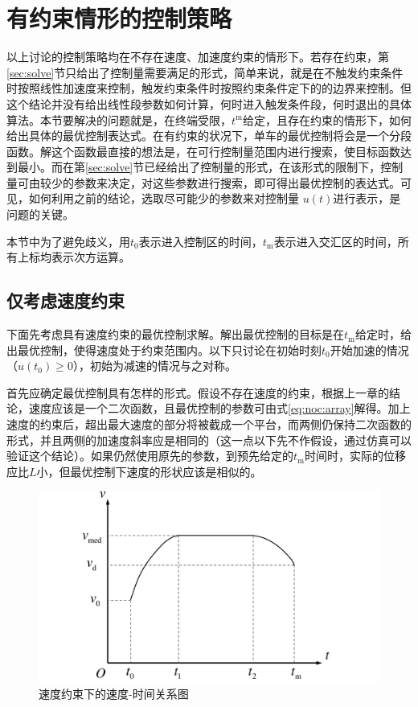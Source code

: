 \section{有约束情形的控制策略}
以上讨论的控制策略均在不存在速度、加速度约束的情形下。若存在约束，第\ref{sec:solve}节只给出了控制量需要满足的形式，简单来说，就是在不触发约束条件时按照线性加速度来控制，触发约束条件时按照约束条件定下的的边界来控制。但这个结论并没有给出线性段参数如何计算，何时进入触发条件段，何时退出的具体算法。本节要解决的问题就是，在终端受限，$t^\mathrm{m}$给定，且存在约束的情形下，如何给出具体的最优控制表达式。在有约束的状况下，单车的最优控制将会是一个分段函数。解这个函数最直接的想法是，在可行控制量范围内进行搜索，使目标函数达到最小。而在第\ref{sec:solve}节已经给出了控制量的形式，在该形式的限制下，控制量可由较少的参数来决定，对这些参数进行搜索，即可得出最优控制的表达式。可见，如何利用之前的结论，选取尽可能少的参数来对控制量 $u(t)$进行表示，是问题的关键。

本节中为了避免歧义，用$t_0$表示进入控制区的时间，$t_\mathrm{m}$表示进入交汇区的时间，所有上标均表示次方运算。

\subsection{仅考虑速度约束}
下面先考虑具有速度约束的最优控制求解。解出最优控制的目标是在$t_\mathrm{m}$给定时，给出最优控制，使得速度处于约束范围内。以下只讨论在初始时刻$t_0$开始加速的情况（$u(t_0)\geq 0$），初始为减速的情况与之对称。

首先应确定最优控制具有怎样的形式。假设不存在速度的约束，根据上一章的结论，速度应该是一个二次函数，且最优控制的参数可由式\eqref{eq:noc:array}解得。加上速度的约束后，超出最大速度的部分将被截成一个平台，而两侧仍保持二次函数的形式，并且两侧的加速度斜率应是相同的（这一点以下先不作假设，通过仿真可以验证这个结论）。如果仍然使用原先的参数，到预先给定的$t_\mathrm{m}$时间时，实际的位移应比$L$小，但最优控制下速度的形状应该是相似的。

\begin{figure}[htbp]
\centering
\includegraphics[width=12cm]{figures/vc.pdf}
\caption{速度约束下的速度-时间关系图}
\label{fig:vc}
\end{figure}

